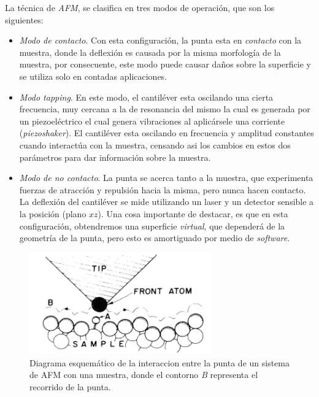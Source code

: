 La técnica de \textit{AFM}, se clasifica en tres modos de operación, que son los siguientes:
 \begin{itemize}
    \item \textit{Modo de contacto}. Con esta configuración, la punta esta en \textit{contacto} con la muestra, donde la deflexión es causada por la misma morfología de la muestra, por consecuente, este modo puede causar daños sobre la superficie y se utiliza solo en contadas aplicaciones.
    
    \item \textit{Modo tapping}. En este modo, el cantiléver esta oscilando una cierta frecuencia, muy cercana a la de resonancia del mismo la cual es generada por un piezoeléctrico el cual genera vibraciones al aplicársele una corriente (\textit{piezoshaker}). El cantiléver esta oscilando en frecuencia y amplitud constantes cuando interactúa con la muestra, censando asi los cambios en estos dos parámetros para dar información sobre la muestra.\cite{Reifenberger2015-bh}
   
    \item \textit{Modo de no contacto}. La punta se acerca tanto a la muestra, que experimenta fuerzas de atracción y repulsión hacia la misma, pero nunca hacen contacto. La deflexión del cantiléver se mide utilizando un laser y un detector sensible a la posición (plano $xz$). Una cosa importante de destacar, es que en esta configuración, obtendremos una superficie \textit{virtual}, que dependerá de la geometría de la punta, pero esto es amortiguado por medio de \textit{software}.
 \end{itemize}

 \begin{figure}[ht!]
    \centering
    \includegraphics[width=0.7\textwidth]{figures/chap3/punta.png}
        \caption{Diagrama esquemático de la interaccion entre la punta de un sistema de AFM con una muestra, donde el 
        contorno \textit{B} representa el recorrido de la punta.\cite{Binnig1986}}
    \label{fig:afm_diagram}
\end{figure}